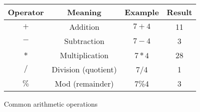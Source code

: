 




\begin {figure}


\begin{tabular} {c c c c}
Operator   &    Meaning & 	Example & Result \\
\hline
$+$	    &	Addition &	   $7+4$   & 11 	 \\
$-$	    &	Subtraction &	   $7-4$   &  3 	 \\
$*$	    &	Multiplication 	   &	$7*4$   & 28  	 \\
$/$	    &	Division (quotient)& 7/4	& 1	 \\
$\%$	    &	Mod (remainder)    & 7\%4	& 3	 \\
\end {tabular}

\caption {Common arithmetic operations }
\label {fig:arithOps}

\end {figure}


